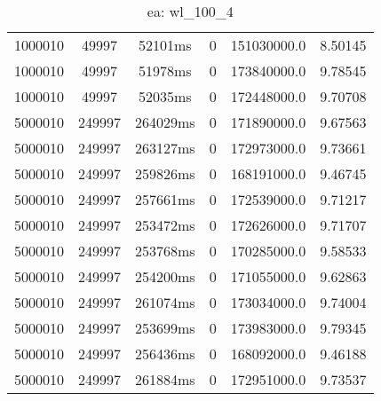 \documentclass[./main.tex]{subfiles}
\begin{document}
\begin{table}
\begin{tabular}{ c | c | c | c | c | c }
        1000010 & 49997 & 52101ms & 0 & 151030000.0 & 8.50145 \\
        1000010 & 49997 & 51978ms & 0 & 173840000.0 & 9.78545 \\
        1000010 & 49997 & 52035ms & 0 & 172448000.0 & 9.70708 \\
        \hline
        5000010 & 249997 & 264029ms & 0 & 171890000.0 & 9.67563 \\
        5000010 & 249997 & 263127ms & 0 & 172973000.0 & 9.73661 \\
        5000010 & 249997 & 259826ms & 0 & 168191000.0 & 9.46745 \\
        \rowcolor{lightgray} 5000010 & 249997 & 257661ms & 0 & 172539000.0 & 9.71217 \\
        5000010 & 249997 & 253472ms & 0 & 172626000.0 & 9.71707 \\
        5000010 & 249997 & 253768ms & 0 & 170285000.0 & 9.58533 \\
        5000010 & 249997 & 254200ms & 0 & 171055000.0 & 9.62863 \\
        5000010 & 249997 & 261074ms & 0 & 173034000.0 & 9.74004 \\
        5000010 & 249997 & 253699ms & 0 & 173983000.0 & 9.79345 \\
        5000010 & 249997 & 256436ms & 0 & 168092000.0 & 9.46188 \\
        5000010 & 249997 & 261884ms & 0 & 172951000.0 & 9.73537 \\
    \end{tabular}
    \caption{ea: wl\_100\_4}
\end{table}
\end{document}
